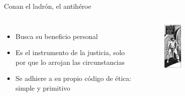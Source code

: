 \begin{frame}{Conan el ladrón, el antihéroe}
\begin{columns}
 \begin{itemize}
   \item Busca su beneficio personal
   \item Es el instrumento de la justicia, solo por que lo arrojan las circunstancias
   \item Se adhiere a su propio código de ética: simple y primitivo
 \end{itemize}
 \begin{figure}[htb]
    \centering
    \includegraphics[width=0.25\textwidth]{img/tropes/antiheroe}
 \end{figure}
 \end{columns}
\end{frame}
\note{

}

